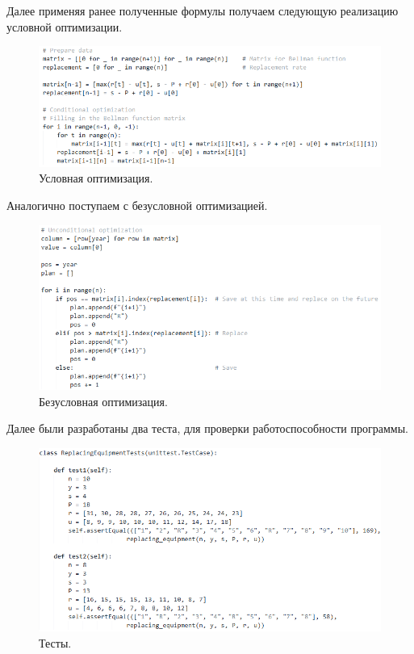 Далее применяя ранее полученные формулы получаем следующую реализацию условной оптимизации.
\begin{figure}[h]
  \centering \includegraphics[scale=0.6]{content/images/impl_equipment3.png}
  \caption{Условная оптимизация.}
  \label{fig:impl_equipment3}
\end{figure}

Аналогично поступаем с безусловной оптимизацией.
\begin{figure}[h]
  \centering \includegraphics[scale=0.5]{content/images/impl_equipment4.png}
  \caption{Безусловная оптимизация.}
  \label{fig:impl_equipment4}
\end{figure}

Далее были разработаны два теста, для проверки работоспособности программы.
\begin{figure}[h]
  \centering \includegraphics[scale=0.7]{content/images/impl_equipment5.png}
  \caption{Тесты.}
  \label{fig:impl_equipment5}
\end{figure}

